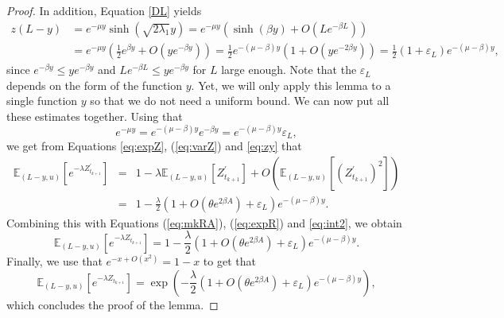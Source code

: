 \documentclass[11pt]{article}
\theoremstyle{plain}
\newcommand\vep{\varepsilon}
\begin{document}
\begin{proof}
In addition, Equation \eqref{DL} yields 
\begin{align}
z(L-y)&=e^{-\mu y}\sinh\left(\sqrt{2\lambda_1}y\right)=e^{-\mu y}\left(\sinh(\beta y)+O(Le^{-\beta L})\right)\nonumber\\
&=e^{-\mu y}\left(\frac{1}{2}e^{\beta y}+O(ye^{-\beta y})\right)=\frac{1}{2}e^{-(\mu-\beta)y}\left(1+O(ye^{-2\beta y})\right)=\frac{1}{2}(1+\vep_L)e^{-(\mu-\beta)y},\quad
\label{eq:zy}
\end{align}
since $e^{-\beta y}\leqslant ye^{-\beta y}$ and $Le^{-\beta L}\leqslant ye^{-\beta y}$ for $L$ large enough.  Note that the $\vep_L$ depends on the form of the function $y$. Yet, we will only  apply this lemma to a single function $y$ so that we do not need a uniform bound.
We can now put all these estimates together. Using that 
\begin{equation}
e^{-\mu y}=e^{-(\mu-\beta) y}e^{-\beta y}= e^{-(\mu-\beta) y}\vep_L \label{eq:int2},
\end{equation} 
we get from Equations \eqref{eq:expZ}, (\ref{eq:varZ}) and \eqref{eq:zy} that
\begin{eqnarray*}
\mathbb{E}_{(L-y,u)}\left[e^{-\lambda Z^{'}_{t_{k+1}}}\right]&=&1-\lambda\mathbb{E}_{(L-y,u)}\left[Z^{'}_{t_{k+1}}\right]+O\left(\mathbb{E}_{(L-y,u)}\left[\left(Z^{'}_{t_{k+1}}\right)^2\right]\right)\\
&=&1-\frac{\lambda}{2}\left(1+O(\theta e^{2\beta A})+\vep_L\right)e^{-(\mu-\beta)y}.
\end{eqnarray*}
Combining this with Equations (\ref{eq:mkRA}), (\ref{eq:expR}) and \eqref{eq:int2}, we obtain 
\begin{equation*}
\mathbb{E}_{(L-y,u)}\left[e^{-\lambda Z^{}_{t_{k+1}}}\right]=1-\frac{\lambda}{2}\left(1+O(\theta e^{2\beta A})+\vep_L\right)e^{-(\mu-\beta)y}.
\end{equation*}
Finally, we use that $e^{-x+O(x^2)}=1-x$ to get that
\begin{equation*}
\mathbb{E}_{(L-y,u)}\left[e^{-\lambda Z^{}_{t_{k+1}}}\right]=\exp\left(-\frac{\lambda}{2}(1+O(\theta e^{2\beta A})+\vep_L)e^{-(\mu-\beta)y}\right),\end{equation*}
which concludes the proof of the lemma.
\end{proof}
\end{document}

